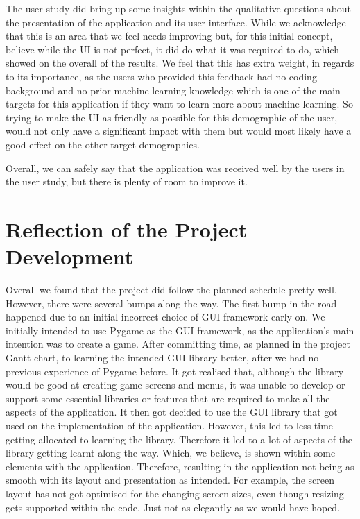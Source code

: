 		The user study did bring up some insights within the qualitative questions about the presentation of the application and its user interface. While we acknowledge that this is an area that we feel needs improving but, for this initial concept, believe while the UI is not perfect, it did do what it was required to do, which showed on the overall of the results. We feel that this has extra weight, in regards to its importance, as the users who provided this feedback had no coding background and no prior machine learning knowledge which is one of the main targets for this application if they want to learn more about machine learning. So trying to make the UI as friendly as possible for this demographic of the user, would not only have a significant impact with them but would most likely have a good effect on the other target demographics.
		
		Overall, we can safely say that the application was received well by the users in the user study, but there is plenty of room to improve it.

	\section{Reflection of the Project Development}
		Overall we found that the project did follow the planned schedule pretty well. However, there were several bumps along the way. The first bump in the road happened due to an initial incorrect choice of GUI framework early on. We initially intended to use Pygame as the GUI framework, as the application's main intention was to create a game. After committing time, as planned in the project Gantt chart, to learning the intended GUI library better, after we had no previous experience of Pygame before. It got realised that, although the library would be good at creating game screens and menus, it was unable to develop or support some essential libraries or features that are required to make all the aspects of the application. It then got decided to use the GUI library that got used on the implementation of the application. However, this led to less time getting allocated to learning the library. Therefore it led to a lot of aspects of the library getting learnt along the way. Which, we believe, is shown within some elements with the application. Therefore, resulting in the application not being as smooth with its layout and presentation as intended. For example, the screen layout has not got optimised for the changing screen sizes, even though resizing gets supported within the code. Just not as elegantly as we would have hoped.

